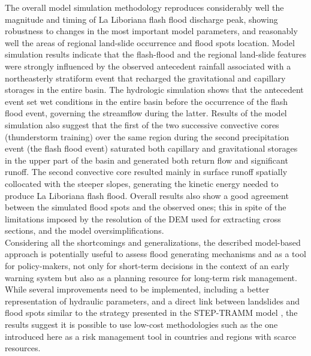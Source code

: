 \documentclass[hess, manuscript]{copernicus}
\begin{document}
The overall model simulation methodology reproduces considerably well the magnitude and timing of La Liboriana flash flood discharge peak, showing robustness to changes in the most important model parameters, and reasonably well the areas of regional land-slide occurrence and flood spots location.  Model simulation results indicate that the flash-flood and the regional land-slide features were strongly influenced by the observed antecedent rainfall associated with a northeasterly stratiform event that recharged the gravitational and capillary storages in the entire basin. The hydrologic simulation shows that the antecedent event set wet conditions in the entire basin before the occurrence of the flash flood event, governing the streamflow during the latter.  Results of the model simulation also suggest that the first of the two successive convective cores (thunderstorm training) over the same region during the second precipitation event (the flash flood event) saturated both capillary and gravitational storages in the upper part of the basin and generated both return flow and significant runoff.  The second convective core resulted mainly in surface runoff spatially collocated with the steeper slopes, generating the kinetic energy needed to produce La Liboriana flash flood. Overall results also show a good agreement between the simulated flood spots and the observed ones; this in spite of the limitations imposed by the resolution of the DEM used for extracting cross sections, and the model oversimplifications. \\

Considering all the shortcomings and generalizations, the described model-based approach is potentially useful to assess flood generating mechanisms and as a tool for policy-makers, not only for short-term decisions in the context of an early warning system but also as a planning resource for long-term risk management. While several improvements need to be implemented, including a better representation of hydraulic parameters,  and a direct link between landslides and flood spots similar to the strategy presented in the STEP-TRAMM model \citep{Fan2017a}, the results suggest it is possible to use  low-cost methodologies such as the one introduced here as a risk management tool in countries and regions with scarce resources.\\

\end{document}
